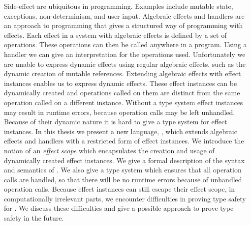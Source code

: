 Side-effect are ubiquitous in programming. Examples include mutable state, exceptions, non-determinism, and user input.
Algebraic effects and handlers are an approach to programming that gives a structured way of programming with effects.
Each effect in a system with algebraic effects is defined by a set of operations.
These operations can then be called anywhere in a program.
Using a handler we can give an interpretation for the operations used.
Unfortunately we are unable to express dynamic effects using regular algebraic effects, such as the dynamic creation of mutable references.
Extending algebraic effects with effect instances enables us to express dynamic effects.
These effect instances can be dynamically created and operations called on them are distinct from the same operation called on a different instance.
Without a type system effect instances may result in runtime errors, because operation calls may be left unhandled.
Because of their dynamic nature it is hard to give a type system for effect instances.
In this thesis we present a new language, \lang{}, which extends algebraic effects and handlers with a restricted form of effect instances.
We introduce the notion of an \emph{effect scope} which encapsulates the creation and usage of dynamically created effect instances. We give a formal description of the syntax and semantics of \lang{}.
We also give a type system which ensures that all operation calls are handled, so that there will be no runtime errors because of unhandled operation calls.
Because effect instances can still escape their effect scope, in computationally irrelevant parts, we encounter difficulties in proving type safety for \lang{}. We discuss these difficulties and give a possible approach to prove type safety in the future.
